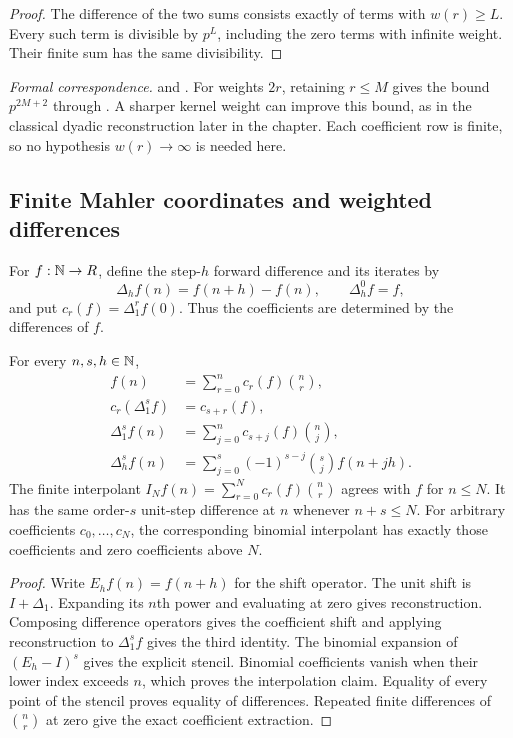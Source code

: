 \begin{proof}
The difference of the two sums consists exactly of terms with $w(r)\geq L$.
Every such term is divisible by $p^L$, including the zero terms with infinite
weight. Their finite sum has the same divisibility.
\end{proof}

\begingroup\small\raggedright
\noindent\emph{Formal correspondence.}
 and
.
For weights $2r$, retaining $r\leq M$ gives the bound $p^{2M+2}$ through
. A sharper kernel weight can improve this
bound, as in the classical dyadic reconstruction later in the chapter. Each
coefficient row is finite, so no hypothesis $w(r)\to\infty$ is needed here.
\par\endgroup

\subsection{Finite Mahler coordinates and weighted differences}

For $f:\mathbb N\to R$, define the step-$h$ forward difference and its iterates by
\[
\Delta_h f(n)=f(n+h)-f(n),\qquad \Delta_h^0 f=f,
\]
and put $c_r(f)=\Delta_1^r f(0)$. Thus the coefficients are determined by the
differences of $f$.

\begin{theorem}
\label{thm:mahler-foundation}
For every $n,s,h\in\mathbb N$,
\[
\begin{aligned}
f(n)&=\sum_{r=0}^{n}c_r(f)\binom nr,\\
c_r(\Delta_1^s f)&=c_{s+r}(f),\\
\Delta_1^s f(n)&=\sum_{j=0}^{n}c_{s+j}(f)\binom nj,\\
\Delta_h^s f(n)&=\sum_{j=0}^{s}(-1)^{s-j}\binom sj f(n+jh).
\end{aligned}
\]
The finite interpolant
$I_Nf(n)=\sum_{r=0}^{N}c_r(f)\binom nr$ agrees with $f$ for $n\leq N$.
It has the same order-$s$ unit-step difference at $n$ whenever $n+s\leq N$.
For arbitrary coefficients $c_0,\ldots,c_N$, the corresponding binomial
interpolant has exactly those coefficients and zero coefficients above $N$.
\end{theorem}

\begin{proof}
Write $E_h f(n)=f(n+h)$ for the shift operator. The unit shift is
$I+\Delta_1$. Expanding its $n$th power and evaluating
at zero gives reconstruction. Composing difference operators gives the
coefficient shift and applying reconstruction to $\Delta_1^s f$ gives the
third identity. The binomial expansion of $(E_h-I)^s$ gives the explicit
stencil. Binomial coefficients vanish when their lower index exceeds $n$,
which proves the interpolation claim. Equality of every point of the stencil
proves equality of differences. Repeated finite differences of $\binom nr$
at zero give the exact coefficient extraction.
\end{proof}

